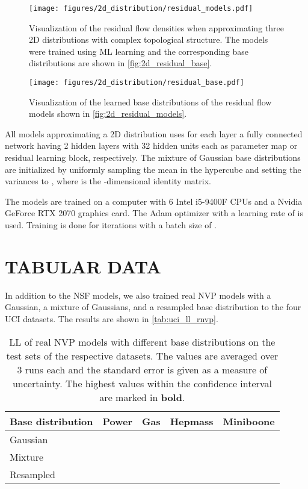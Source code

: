 \documentclass[twoside]{article}
\begin{document}
\begin{figure}[!h]
    \centering
    \texttt{[image: figures/2d\_distribution/residual\_models.pdf]}
    \caption{Visualization of the residual flow densities when approximating three 2D distributions with complex topological structure. The models were trained using ML learning and the corresponding base distributions are shown in \autoref{fig:2d_residual_base}.}
    \label{fig:2d_residual_models}


\texttt{[image: figures/2d\_distribution/residual\_base.pdf]}
    \caption{Visualization of the learned base distributions of the residual flow models shown in \autoref{fig:2d_residual_models}.}
    \label{fig:2d_residual_base}
\end{figure}

All models approximating a 2D distribution uses for each layer a fully connected network having 2 hidden layers with 32 hidden units each as parameter map or residual learning block, respectively. The mixture of Gaussian base distributions are initialized by uniformly sampling the mean in the hypercube  and setting the variances to , where  is the -dimensional identity matrix.

The models are trained on a computer with 6 Intel i5-9400F CPUs and a Nvidia GeForce RTX 2070 graphics card. The Adam optimizer with a learning rate of  is used. Training is done for  iterations with a batch size of .




\section{TABULAR DATA}
\label{sec:tab_app}

In addition to the NSF models, we also trained real NVP models with a Gaussian, a mixture of Gaussians, and a resampled base distribution to the four UCI datasets. The results are shown in \autoref{tab:uci_ll_rnvp}.

\begin{table*}[h]
  \caption{LL of real NVP models with different base distributions on the test sets of the respective datasets. The values are averaged over 3 runs each and the standard error is given as a measure of uncertainty. The highest values within the confidence interval are marked in \textbf{bold}.}
  \label{tab:uci_ll_rnvp}
  \centering
  \vspace{0.3cm}
  \begin{tabular}{l|llll}
    Base distribution & Power & Gas & Hepmass & Miniboone \\
    \hline
    Gaussian &  &  &  &  \\
    Mixture &  &  &  &  \\
    Resampled &  &  &  & 
  \end{tabular}
\end{table*}
\end{document}
